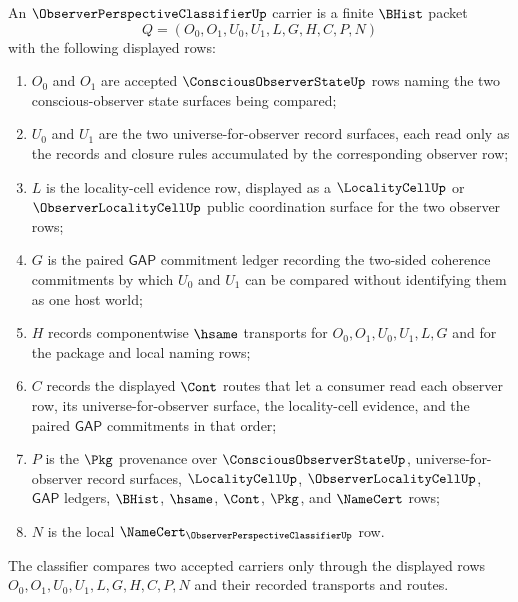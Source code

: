 \begin{definition}
\label{def:observer-perspective-classifier-carrier}
An $\ObserverPerspectiveClassifierUp$ carrier is a finite $\BHist$ packet
$$
Q=(O_0,O_1,U_0,U_1,L,G,H,C,P,N)
$$
with the following displayed rows:
\begin{enumerate}
\item $O_0$ and $O_1$ are accepted $\ConsciousObserverStateUp$ rows naming the two conscious-observer state surfaces being compared;
\item $U_0$ and $U_1$ are the two universe-for-observer record surfaces, each read only as the records and closure rules accumulated by the corresponding observer row;
\item $L$ is the locality-cell evidence row, displayed as a $\LocalityCellUp$ or $\ObserverLocalityCellUp$ public coordination surface for the two observer rows;
\item $G$ is the paired $\mathsf{GAP}$ commitment ledger recording the two-sided coherence commitments by which $U_0$ and $U_1$ can be compared without identifying them as one host world;
\item $H$ records componentwise $\hsame$ transports for $O_0,O_1,U_0,U_1,L,G$ and for the package and local naming rows;
\item $C$ records the displayed $\Cont$ routes that let a consumer read each observer row, its universe-for-observer surface, the locality-cell evidence, and the paired $\mathsf{GAP}$ commitments in that order;
\item $P$ is the $\Pkg$ provenance over $\ConsciousObserverStateUp$, universe-for-observer record surfaces, $\LocalityCellUp$, $\ObserverLocalityCellUp$, $\mathsf{GAP}$ ledgers, $\BHist$, $\hsame$, $\Cont$, $\Pkg$, and $\NameCert$ rows;
\item $N$ is the local $\NameCert_{\ObserverPerspectiveClassifierUp}$ row.
\end{enumerate}
The classifier compares two accepted carriers only through the displayed rows $O_0,O_1,U_0,U_1,L,G,H,C,P,N$ and their recorded transports and routes.
\end{definition}

